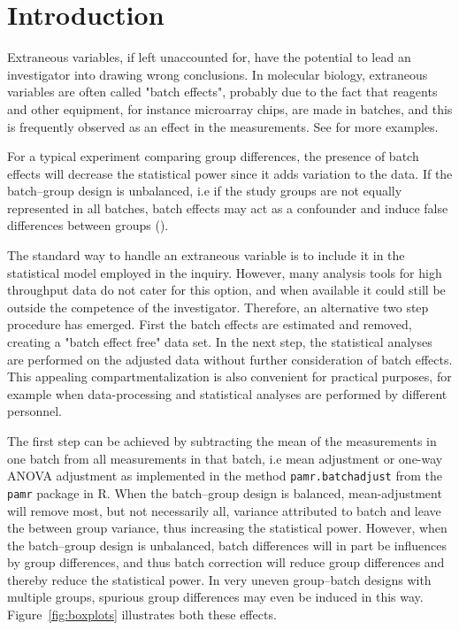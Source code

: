 \documentclass{bio}
\begin{document}
\section{Introduction}\label{intro}

Extraneous variables, if left unaccounted for, have the potential to lead an investigator into drawing wrong conclusions. In molecular biology, extraneous variables are often called "batch effects", probably due to the fact that reagents and other equipment, for instance microarray chips, are made in batches, and this is frequently observed as an effect in the measurements. See \citet{Luo2010} for more examples. 

For a typical experiment comparing group differences, the presence of batch effects will decrease the statistical power since it adds variation to the data. If the batch--group design is unbalanced, i.e if the study groups are not equally represented in all batches, batch effects may act as a confounder and induce false differences between groups (\citealp{Leek2010}).

The standard way to handle an extraneous variable is to include it in the statistical model employed in the inquiry. However, many analysis tools for high throughput data do not cater for this option, and when available it could still be outside the competence of the investigator. Therefore, an alternative two step procedure has emerged. First the batch effects are estimated and removed, creating a "batch effect free" data set. In the next step, the statistical analyses are performed on the adjusted data without further consideration of batch effects. This appealing compartmentalization is also convenient for practical purposes, for example when data-processing and statistical analyses are performed by different personnel.

The first step can be achieved by subtracting the mean of the measurements in one batch from all measurements in that batch, i.e mean adjustment or one-way ANOVA adjustment as implemented in the method \texttt{pamr.batchadjust} from the \texttt{pamr} package in R. When the batch--group design is balanced, mean-adjustment will remove most, but not necessarily all, variance attributed to batch and leave the between group variance, thus increasing the statistical power. However, when the batch--group design is unbalanced, batch differences will in part be influences by group differences, and thus batch correction will reduce group differences and thereby reduce the statistical power. In very uneven group--batch designs with multiple groups, spurious group differences may even be induced in this way. Figure~\ref{fig:boxplots} illustrates both these effects.
\end{document}
